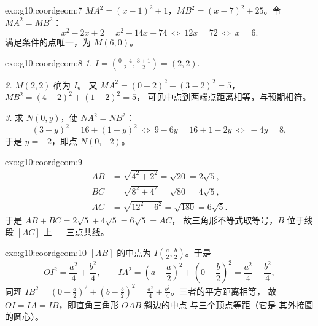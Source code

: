 \begin{solution}{exo:g10:coordgeom:7}
$MA^2 = (x - 1)^2 + 1$，$MB^2 = (x - 7)^2 + 25$。令
$MA^2 = MB^2$：
\[
x^2 - 2x + 2 = x^2 - 14x + 74
\ \Longleftrightarrow\
12x = 72
\ \Longleftrightarrow\
x = 6 .
\]
满足条件的点唯一，为 $M(6, 0)$。
\end{solution}

\begin{solution}{exo:g10:coordgeom:8}
\emph{1.} $I = \left(\frac{0+4}{2}, \frac{3+1}{2}\right) = (2, 2)$.

\emph{2.} $M(2,2)$ 确为 $I$。
又 $MA^2 = (0-2)^2 + (3-2)^2 = 5$，$MB^2 = (4-2)^2 + (1-2)^2 = 5$，
可见中点到两端点距离相等，与预期相符。

\emph{3.} 求 $N(0, y)$，使 $NA^2 = NB^2$：
\[
(3 - y)^2 = 16 + (1 - y)^2
\ \Longleftrightarrow\
9 - 6y = 16 + 1 - 2y
\ \Longleftrightarrow\
-4y = 8,
\]
于是 $y = -2$，即点 $N(0, -2)$。
\end{solution}

\begin{solution}{exo:g10:coordgeom:9}
\begin{align*}
AB &= \sqrt{4^2 + 2^2} = \sqrt{20} = 2\sqrt5, \\
BC &= \sqrt{8^2 + 4^2} = \sqrt{80} = 4\sqrt5, \\
AC &= \sqrt{12^2 + 6^2} = \sqrt{180} = 6\sqrt5 .
\end{align*}
于是 $AB + BC = 2\sqrt5 + 4\sqrt5 = 6\sqrt5 = AC$，
故三角形不等式取等号，$B$ 位于线段 $[AC]$ 上 ---
三点共线。
\end{solution}

\begin{solution}{exo:g10:coordgeom:10}
$[AB]$ 的中点为 $I\left(\frac a2, \frac b2\right)$。于是
\[
OI^2 = \frac{a^2}{4} + \frac{b^2}{4},
\qquad
IA^2 = \left(a - \frac a2\right)^2 + \left(0 - \frac b2\right)^2
= \frac{a^2}{4} + \frac{b^2}{4},
\]
同理 $IB^2 = \left(0 - \frac a2\right)^2 + \left(b - \frac b2\right)^2 =
\frac{a^2}{4} + \frac{b^2}{4}$。三者的平方距离相等，
故 $OI = IA = IB$，即直角三角形 $OAB$ 斜边的中点
与三个顶点等距（它是
其外接圆的圆心）。
\end{solution}

